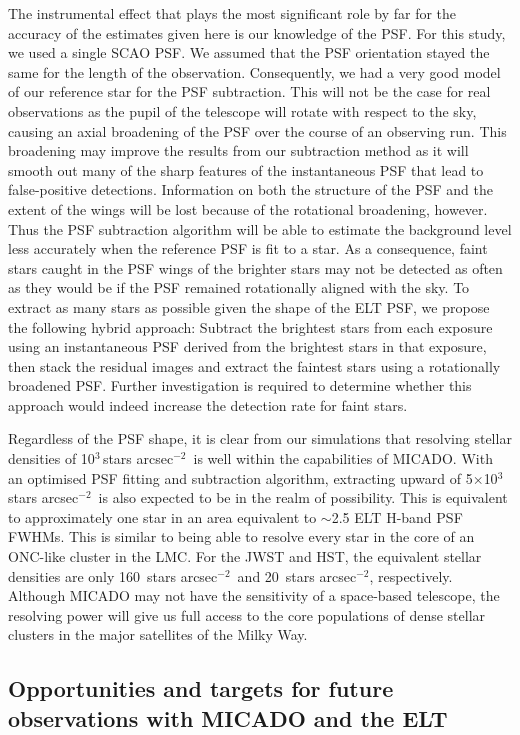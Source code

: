 \documentclass[referee]{aa}
\newcommand{\s}{$\sim$}
\newcommand{\h}[1]{$^{#1}$}
\newcommand{\spa}{stars arcsec$^{-2}$~}
\newcommand{\spae}{stars arcsec$^{-2}$}
\begin{document}
The instrumental effect that plays the most significant role by far for the accuracy of the estimates given here is our knowledge of the PSF\@.
For this study, we used a single SCAO PSF\@.
We assumed that the PSF orientation stayed the same for the length of the observation.
Consequently, we had a very good model of our reference star for the PSF subtraction.
This will not be the case for real observations as the pupil of the telescope will rotate with respect to the sky, causing an axial broadening of the PSF over the course of an observing run.
This broadening may improve the results from our subtraction method as it will smooth out many of the sharp features of the instantaneous PSF that lead to false-positive detections.
Information on both the structure of the PSF and the extent of the wings will be lost because of the rotational broadening, however.
Thus the PSF subtraction algorithm will be able to estimate the background level less accurately when the reference PSF is fit to a star.
As a consequence, faint stars caught in the PSF wings of the brighter stars may not be detected as often as they would be if the PSF remained rotationally aligned with the sky.
To extract as many stars as possible given the shape of the ELT PSF, we propose the following hybrid approach: Subtract the brightest stars from each exposure using an instantaneous PSF derived from the brightest stars in that exposure, then stack the residual images and extract the faintest stars using a rotationally broadened PSF\@.
Further investigation is required to determine whether this approach would indeed increase the detection rate for faint stars.

Regardless of the PSF shape, it is clear from our simulations that resolving stellar densities of 10\h3\,\spa is well within the capabilities of MICADO\@.
With an optimised PSF fitting and subtraction algorithm, extracting upward of 5$\times$10\h3\,\spa is also expected to be in the realm of possibility.
This is equivalent to approximately one star in an area equivalent to \s2.5 ELT H-band PSF FWHMs.
This is similar to being able to resolve every star in the core of an ONC-like cluster in the LMC\@.
For the JWST and HST, the equivalent stellar densities are only 160~\spa and 20~\spae, respectively.
Although MICADO may not have the sensitivity of a space-based telescope, the resolving power will give us full access to the core populations of dense stellar clusters in the major satellites of the Milky Way.


\subsection{Opportunities and targets for future observations with MICADO and the ELT}
  \label{subsec:future_opportunities}
\end{document}
